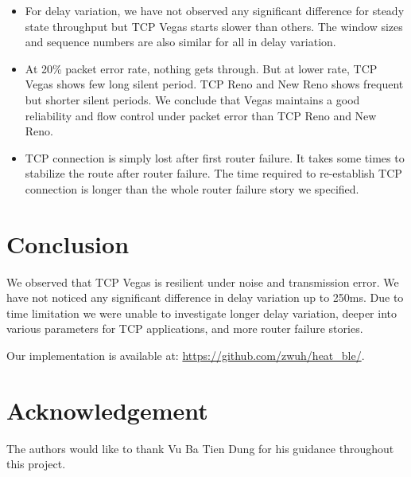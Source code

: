 \documentclass[conference,a4paper]{../../sty/IEEEtran}
\begin{document}
\begin{itemize}
 \item For delay variation, we have not observed any significant difference for steady state throughput but TCP Vegas starts slower than others. The window sizes and sequence numbers are also similar for all in delay variation.
 \item At 20\% packet error rate, nothing gets through. But at lower rate, TCP Vegas shows few long silent period. TCP Reno and New Reno shows frequent but shorter silent periods. We conclude that Vegas maintains a good reliability and flow control under packet error than TCP Reno and New Reno.
 \item TCP connection is simply lost after first router failure. It takes some times to stabilize the route after router failure. The time required to re-establish TCP connection is longer than the whole router failure story we specified.
 
\end{itemize}


\section{Conclusion}
We observed that TCP Vegas is resilient under noise and transmission error.
We have not noticed any significant difference in delay variation up to 250ms.
Due to time limitation we were unable to investigate longer delay variation, deeper into various parameters for TCP applications, and more router failure stories.

Our implementation is available at: \url{https://github.com/zwuh/heat_ble/}.


\section*{Acknowledgement}
The authors would like to thank Vu Ba Tien Dung for his guidance throughout this project.




\nocite*{}


\end{document}
